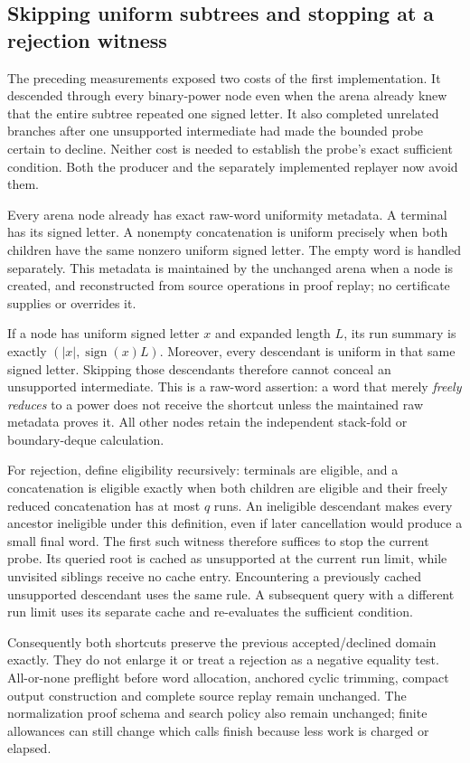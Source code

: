 \subsection{Skipping uniform subtrees and stopping at a rejection witness}
\label{sec:syllable-frontier}

The preceding measurements exposed two costs of the first implementation.
It descended through every binary-power node even when the arena already
knew that the entire subtree repeated one signed letter. It also completed
unrelated branches after one unsupported intermediate had made the bounded
probe certain to decline. Neither cost is needed to establish the probe's
exact sufficient condition. Both the producer and the separately implemented
replayer now avoid them.

Every arena node already has exact raw-word uniformity metadata. A terminal
has its signed letter. A nonempty concatenation is uniform precisely when
both children have the same nonzero uniform signed letter. The empty word
is handled separately. This metadata is maintained by the unchanged arena
when a node is created, and reconstructed from source operations in proof
replay; no certificate supplies or overrides it.

If a node has uniform signed letter $x$ and expanded length $L$, its run
summary is exactly $(|x|,\operatorname{sign}(x)L)$. Moreover, every descendant
is uniform in that same signed letter. Skipping those descendants therefore
cannot conceal an unsupported intermediate. This is a raw-word assertion:
a word that merely \emph{freely reduces} to a power does not receive the
shortcut unless the maintained raw metadata proves it. All other nodes
retain the independent stack-fold or boundary-deque calculation.

For rejection, define eligibility recursively: terminals are eligible,
and a concatenation is eligible exactly when both children are eligible
and their freely reduced concatenation has at most $q$ runs. An ineligible
descendant makes every ancestor ineligible under this definition, even if
later cancellation would produce a small final word. The first such witness
therefore suffices to stop the current probe. Its queried root is cached
as unsupported at the current run limit, while unvisited siblings receive
no cache entry. Encountering a previously cached unsupported descendant
uses the same rule. A subsequent query with a different run limit uses
its separate cache and re-evaluates the sufficient condition.

Consequently both shortcuts preserve the previous accepted/declined domain
exactly. They do not enlarge it or treat a rejection as a negative equality
test. All-or-none preflight before word allocation, anchored cyclic trimming,
compact output construction and complete source replay remain unchanged.
The normalization proof schema and search policy also remain unchanged;
finite allowances can still change which calls finish because less work
is charged or elapsed.


